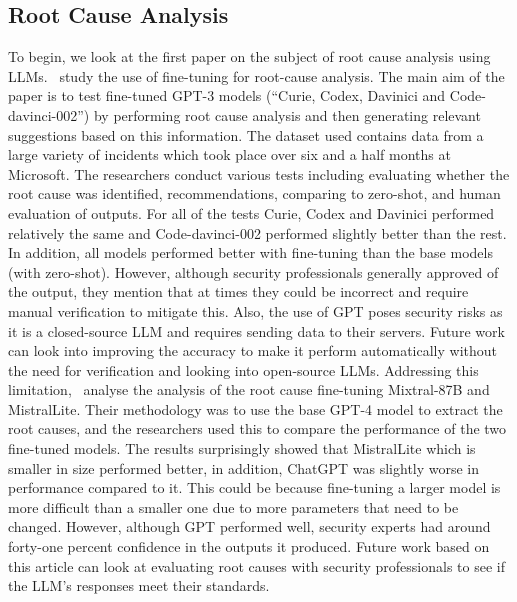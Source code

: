 \subsection{Root Cause Analysis}
To begin, we look at the first paper on the subject of root cause analysis using LLMs.~\cite{ahmed2023recommending} study the use of fine-tuning for root-cause analysis. The main aim of the paper is to test fine-tuned GPT-3 models (``Curie, Codex, Davinici and Code-davinci-002'') by performing root cause analysis and then generating relevant suggestions based on this information. The dataset used contains data from a large variety of incidents which took place over six and a half months at Microsoft. The researchers conduct various tests including evaluating whether the root cause was identified, recommendations, comparing to zero-shot, and human evaluation of outputs. For all of the tests Curie, Codex and Davinici performed relatively the same and Code-davinci-002 performed slightly better than the rest. In addition, all models performed better with fine-tuning than the base models (with zero-shot). However, although security professionals generally approved of the output, they mention that at times they could be incorrect and require manual verification to mitigate this. Also, the use of GPT poses security risks as it is a closed-source LLM and requires sending data to their servers. Future work can look into improving the accuracy to make it perform automatically without the need for verification and looking into open-source LLMs. Addressing this limitation,~\cite{mandakath2024root} analyse the analysis of the root cause fine-tuning Mixtral-87B and MistralLite. Their methodology was to use the base GPT-4 model to extract the root causes, and the researchers used this to compare the performance of the two fine-tuned models. The results surprisingly showed that MistralLite which is smaller in size performed better, in addition, ChatGPT was slightly worse in performance compared to it. This could be because fine-tuning a larger model is more difficult than a smaller one due to more parameters that need to be changed. However, although GPT performed well, security experts had around forty-one percent confidence in the outputs it produced. Future work based on this article can look at evaluating root causes with security professionals to see if the LLM's responses meet their standards.

